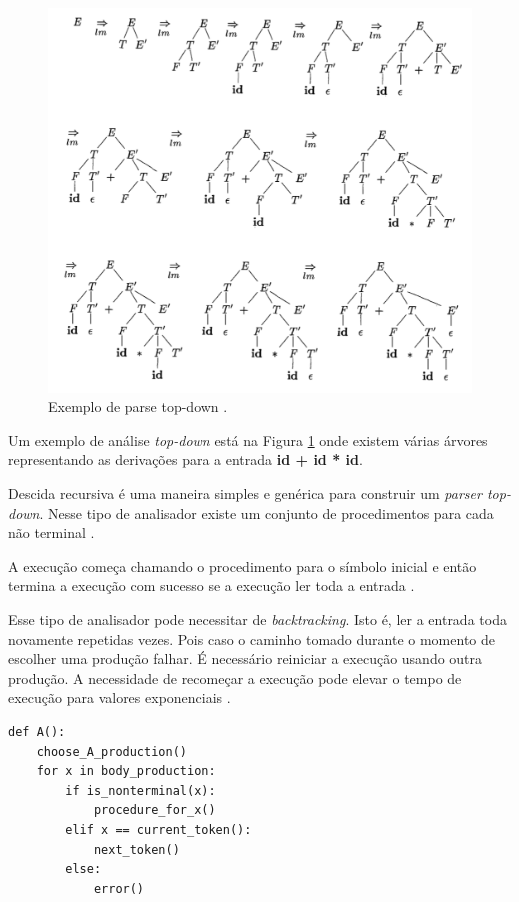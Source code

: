 \begin{figure}[h]
	\centering
	\includegraphics[keepaspectratio=true,scale=0.7]{figuras/parsetopdowntree.png}
	\caption{Exemplo de parse top-down \cite{aho2006}.}
	\label{fig:parsetopdowntree}
\end{figure}

Um exemplo de análise \textit{top-down} está na Figura \ref{fig:parsetopdowntree} 
onde existem várias árvores representando as derivações para a entrada \textbf{id + id * id}.

Descida recursiva é uma maneira simples e genérica para construir um \textit{parser top-down}.
Nesse tipo de analisador existe um conjunto de procedimentos para cada não terminal \cite{aho2006}. 

A execução começa chamando o procedimento para o símbolo inicial e então 
termina a execução com sucesso se a execução ler toda a entrada \cite{aho2006}. 

Esse tipo de analisador pode necessitar de \textit{backtracking}. Isto é, ler a entrada toda
novamente repetidas vezes. Pois caso o caminho tomado durante o momento de escolher uma produção falhar.
É necessário reiniciar a execução usando outra produção. A necessidade de recomeçar a execução
pode elevar o tempo de execução para valores exponenciais \cite{aho2006}. 

\begin{lstlisting}[caption=Exemplo de procedimento para um não terminal em descida recursiva,label={lst:recursive}]
def A():
    choose_A_production()
    for x in body_production:
        if is_nonterminal(x):
            procedure_for_x()
        elif x == current_token():
            next_token()
        else:
            error()
\end{lstlisting}

